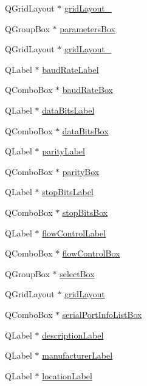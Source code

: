 \begin{DoxyCompactItemize}
\item 
Q\+Grid\+Layout $\ast$ \hyperlink{a00082_a2cc53955b73f22f0cfcf508da4654b16}{grid\+Layout\+\_}
\item 
Q\+Group\+Box $\ast$ \hyperlink{a00082_a47cebbe70a990bd1f309250101022889}{parameters\+Box}
\item 
Q\+Grid\+Layout $\ast$ \hyperlink{a00082_a7b71d6038a34f600625f007630c5234e}{grid\+Layout\+\_}
\item 
Q\+Label $\ast$ \hyperlink{a00082_a57e59712bae4f482b1ff1d61c81471e8}{baud\+Rate\+Label}
\item 
Q\+Combo\+Box $\ast$ \hyperlink{a00082_a766a61db4a8c72219543f7c096ae5601}{baud\+Rate\+Box}
\item 
Q\+Label $\ast$ \hyperlink{a00082_a4d827d5f217aa166e228b0e2c9c5aaf7}{data\+Bits\+Label}
\item 
Q\+Combo\+Box $\ast$ \hyperlink{a00082_ab6082bb196e22af4ca04a04db3402166}{data\+Bits\+Box}
\item 
Q\+Label $\ast$ \hyperlink{a00082_ae062846ca8db471d7eb362ae39123422}{parity\+Label}
\item 
Q\+Combo\+Box $\ast$ \hyperlink{a00082_a88c0b5d1f96a308ab115937b090f7bba}{parity\+Box}
\item 
Q\+Label $\ast$ \hyperlink{a00082_a665748b39dda24475690e2363b72e265}{stop\+Bits\+Label}
\item 
Q\+Combo\+Box $\ast$ \hyperlink{a00082_ad61890c5fd0acc9e72385efd02df90c0}{stop\+Bits\+Box}
\item 
Q\+Label $\ast$ \hyperlink{a00082_a7876a6baf43bd21d3b816f6a5a24fffc}{flow\+Control\+Label}
\item 
Q\+Combo\+Box $\ast$ \hyperlink{a00082_a1ebdf5da704108eae1078cefc446fbef}{flow\+Control\+Box}
\item 
Q\+Group\+Box $\ast$ \hyperlink{a00082_aea3871481f7ecb94f1835e519631f9a2}{select\+Box}
\item 
Q\+Grid\+Layout $\ast$ \hyperlink{a00082_a07d152c7cc63e2cffdda613baea54c0f}{grid\+Layout}
\item 
Q\+Combo\+Box $\ast$ \hyperlink{a00082_a323eca0d6d4b94d2d41c7737fe8b2282}{serial\+Port\+Info\+List\+Box}
\item 
Q\+Label $\ast$ \hyperlink{a00082_aaf2756662f744e79aa3443f1e035870d}{description\+Label}
\item 
Q\+Label $\ast$ \hyperlink{a00082_afeadc7657c9eaa3103bd529342f5fe97}{manufacturer\+Label}
\item 
Q\+Label $\ast$ \hyperlink{a00082_ad860892f11a79cb726643d3478078fcd}{location\+Label}

\end{DoxyCompactItemize}
